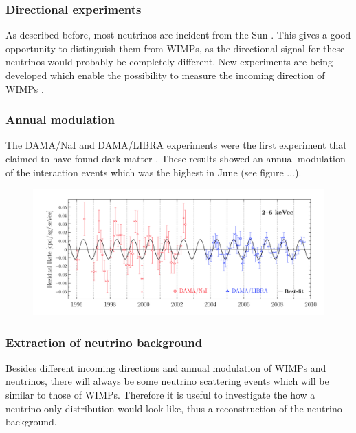 \documentclass{article}
\begin{document}
\subsubsection{Directional experiments}
As described before, most neutrinos are incident from the Sun \cite{Billard:2013qya}. This gives a good opportunity to distinguish them from WIMPs, as the directional signal for these neutrinos would probably be completely different. New experiments are being developed which enable the possibility to measure the incoming direction of WIMPs \cite{Ahlen:2009ev}. 

\subsubsection{Annual modulation}
The DAMA/NaI and DAMA/LIBRA experiments were the first experiment that claimed to have found dark matter \cite{Freese:2012xd}. These results showed an annual modulation of the interaction events which was the highest in June (see figure ...).
\begin{figure}[h]
    \centering
    \includegraphics[width=\textwidth]{Annualmodulation.png}
    \caption{}
\end{figure}

\FloatBarrier
\subsubsection{Extraction of neutrino background}
Besides different incoming directions and annual modulation of WIMPs and neutrinos, there will always be some neutrino scattering events which will be similar to those of WIMPs. Therefore it is useful to investigate the how a neutrino only distribution would look like, thus a reconstruction of the neutrino background. 
\end{document}
